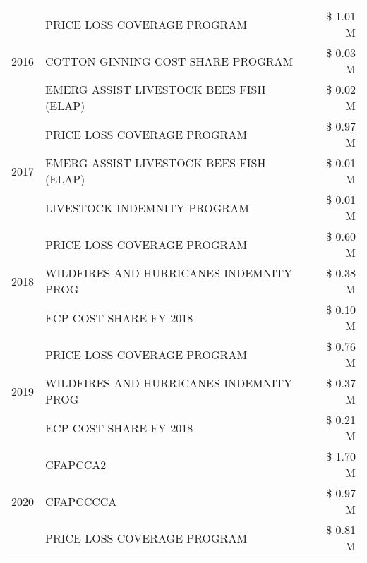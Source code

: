 \begin{tabular}{llr}
\cline{1-3}
\multirow[t]{3}{*}{2016} & PRICE LOSS COVERAGE PROGRAM                   & \$ 1.01 M \\
 & COTTON GINNING COST SHARE PROGRAM             & \$ 0.03 M \\
 & EMERG ASSIST LIVESTOCK BEES FISH (ELAP)       & \$ 0.02 M \\
\cline{1-3}
\multirow[t]{3}{*}{2017} & PRICE LOSS COVERAGE PROGRAM & \$ 0.97 M \\
 & EMERG ASSIST LIVESTOCK BEES FISH (ELAP) & \$ 0.01 M \\
 & LIVESTOCK INDEMNITY PROGRAM & \$ 0.01 M \\
\cline{1-3}
\multirow[t]{3}{*}{2018} & PRICE LOSS COVERAGE PROGRAM & \$ 0.60 M \\
 & WILDFIRES AND HURRICANES INDEMNITY PROG & \$ 0.38 M \\
 & ECP COST SHARE FY 2018 & \$ 0.10 M \\
\cline{1-3}
\multirow[t]{3}{*}{2019} & PRICE LOSS COVERAGE PROGRAM & \$ 0.76 M \\
 & WILDFIRES AND HURRICANES INDEMNITY PROG & \$ 0.37 M \\
 & ECP COST SHARE FY 2018 & \$ 0.21 M \\
\cline{1-3}
\multirow[t]{3}{*}{2020} & CFAPCCA2 & \$ 1.70 M \\
 & CFAPCCCCA & \$ 0.97 M \\
 & PRICE LOSS COVERAGE PROGRAM & \$ 0.81 M \\
\cline{1-3}
\bottomrule
\end{tabular}
